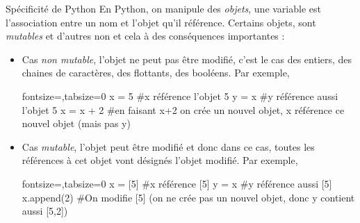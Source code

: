 \documentclass[10pt]{beamer}
\begin{document}
\begin{frame}[fragile]{\Ctitle}{\stitle}
	\begin{alertblock}{\textcolor{yellow}{\small \important} Spécificité de Python}
		En Python, on manipule des \textit{objets}, une variable est l'association entre un nom et l'objet qu'il référence. Certains objets, sont \textit{mutables} et d'autres non et cela à des conséquences importantes :
		\begin{itemize}
			\item Cas \textit{non mutable}, l'objet ne peut pas être modifié, c'est le cas des entiers, des chaines de caractères, des flottants, des booléens. Par exemple,
			      \begin{codepython*}{fontsize=\footnotesize,tabsize=0}
					x = 5     #x référence l'objet 5
					y = x	  #y référence aussi l'objet 5
					x = x + 2 #en faisant x+2 on crée un nouvel objet, x référence ce nouvel objet (mais pas y)
			      \end{codepython*}
			\item Cas \textit{mutable}, l'objet peut être modifié et donc dans ce cas, toutes les références à cet objet vont désignés l'objet modifié. Par exemple,
			      \begin{codepython*}{fontsize=\footnotesize,tabsize=0}
				    x = [5]  #x référence [5]
				    y = x    #y référence aussi [5]
				    x.append(2) #On modifie [5] (on ne crée pas un nouvel objet, donc y contient aussi [5,2])
			      \end{codepython*}
		\end{itemize}
	\end{alertblock}
\end{frame}
\end{document}
